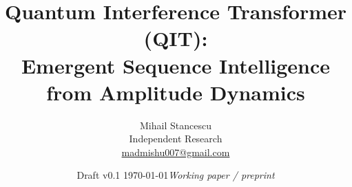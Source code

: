 \documentclass[11pt,a4paper]{article}
\begin{document}
\title{\textbf{Quantum Interference Transformer (QIT):\\
       Emergent Sequence Intelligence from Amplitude Dynamics}}

\author{Mihail Stancescu\\[2pt]
        \small Independent Research\\
        \small \href{mailto:madmishu007@gmail.com}{madmishu007@gmail.com}}

\date{Draft v0.1 \quad \today \quad \textit{Working paper / preprint}}

\maketitle
\thispagestyle{empty}

\end{document}
